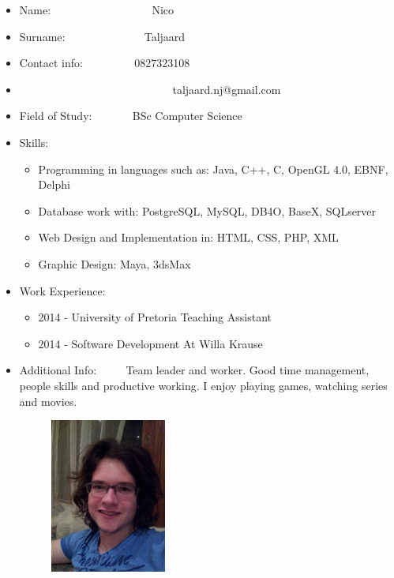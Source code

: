 \documentclass[12pt]{article}
\begin{document}
\begin{itemize}
	\item Name: \ ~~~~~~~~~~~~~~~ \ Nico
	\item Surname: \ ~~~~~~~~~~~ \ Taljaard
	\item Contact info: \ ~~~~~~ \ 0827323108 
	\item \ ~~~~~~~~~~~~~~~~~~~~~~~~~ \ taljaard.nj@gmail.com
	\item Field of Study: \ ~~~~ \ BSc Computer Science
	\item Skills: \begin{itemize}
					\item Programming in languages such as: Java, C++, C, OpenGL 4.0, EBNF, Delphi
					\item Database work with: PostgreSQL, MySQL, DB4O, BaseX, SQLserver
					\item Web Design and Implementation in: HTML, CSS, PHP, XML
					\item Graphic Design: Maya, 3dsMax
				  \end{itemize}
	\item Work Experience: \begin{itemize}
								\item 2014 - University of Pretoria Teaching Assistant
								\item 2014 - Software Development At Willa Krause
							\end{itemize}
	\item Additional Info: \ ~~ \ Team leader and worker. Good time management, people skills and productive working. I enjoy playing games, watching series and movies.	
\end{itemize}

\newpage
\begin{figure}[ht!]
\centering
\includegraphics[width=2in, height=2in]{./Pictures/MathysEllis.jpg}
\end{figure}
\end{document}
